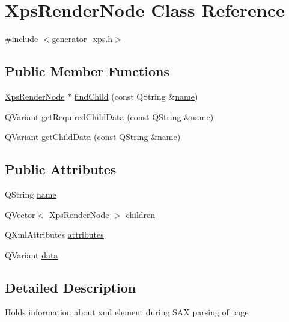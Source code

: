 \hypertarget{classXpsRenderNode}{\section{Xps\+Render\+Node Class Reference}
\label{classXpsRenderNode}
}


{\ttfamily \#include $<$generator\+\_\+xps.\+h$>$}

\subsection*{Public Member Functions}
\begin{DoxyCompactItemize}
\item 
\hyperlink{classXpsRenderNode}{Xps\+Render\+Node} $\ast$ \hyperlink{classXpsRenderNode_a91777855666ee3b327a67485b9d50f84}{find\+Child} (const Q\+String \&\hyperlink{classXpsRenderNode_a7b3d33b9669c0235e095d5efc870ccf0}{name})
\item 
Q\+Variant \hyperlink{classXpsRenderNode_a8d897b4ee08e42ca6844ce23c80beb55}{get\+Required\+Child\+Data} (const Q\+String \&\hyperlink{classXpsRenderNode_a7b3d33b9669c0235e095d5efc870ccf0}{name})
\item 
Q\+Variant \hyperlink{classXpsRenderNode_a7b201a5c93024bcb63ebb6e913a010f8}{get\+Child\+Data} (const Q\+String \&\hyperlink{classXpsRenderNode_a7b3d33b9669c0235e095d5efc870ccf0}{name})
\end{DoxyCompactItemize}
\subsection*{Public Attributes}
\begin{DoxyCompactItemize}
\item 
Q\+String \hyperlink{classXpsRenderNode_a7b3d33b9669c0235e095d5efc870ccf0}{name}
\item 
Q\+Vector$<$ \hyperlink{classXpsRenderNode}{Xps\+Render\+Node} $>$ \hyperlink{classXpsRenderNode_a8a1cc47feef96fa119b2491e60ebeb09}{children}
\item 
Q\+Xml\+Attributes \hyperlink{classXpsRenderNode_a7f6fca2e06dd119e7eb20139af6c8477}{attributes}
\item 
Q\+Variant \hyperlink{classXpsRenderNode_a1b07b9ac5eb86bec6d9f94ec5c855065}{data}
\end{DoxyCompactItemize}


\subsection{Detailed Description}
Holds information about xml element during S\+A\+X parsing of page 

